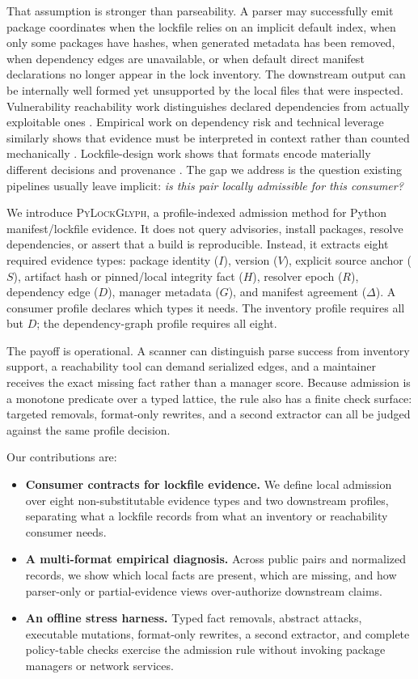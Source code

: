 \documentclass[10pt,conference]{IEEEtran}
\newcommand{\tool}{\textsc{PyLockGlyph}}
\begin{document}
That assumption is stronger than parseability. A parser may successfully emit package coordinates when the lockfile relies on an implicit default index, when only some packages have hashes, when generated metadata has been removed, when dependency edges are unavailable, or when default direct manifest declarations no longer appear in the lock inventory. The downstream output can be internally well formed yet unsupported by the local files that were inspected. Vulnerability reachability work distinguishes declared dependencies from actually exploitable ones \cite{ponta2020vuln,pashchenko2022vuln4real}. Empirical work on dependency risk and technical leverage similarly shows that evidence must be interpreted in context rather than counted mechanically \cite{pashchenko2018matter,massacci2021leverage}. Lockfile-design work shows that formats encode materially different decisions and provenance \cite{gamage2025lockfiles}. The gap we address is the question existing pipelines usually leave implicit: \emph{is this pair locally admissible for this consumer?}

We introduce \tool, a profile-indexed admission method for Python manifest/lockfile evidence. It does not query advisories, install packages, resolve dependencies, or assert that a build is reproducible. Instead, it extracts eight required evidence types: package identity ($I$), version ($V$), explicit source anchor ($S$), artifact hash or pinned/local integrity fact ($H$), resolver epoch ($R$), dependency edge ($D$), manager metadata ($G$), and manifest agreement ($\Delta$). A consumer profile declares which types it needs. The inventory profile requires all but $D$; the dependency-graph profile requires all eight.

The payoff is operational. A scanner can distinguish parse success from inventory support, a reachability tool can demand serialized edges, and a maintainer receives the exact missing fact rather than a manager score. Because admission is a monotone predicate over a typed lattice, the rule also has a finite check surface: targeted removals, format-only rewrites, and a second extractor can all be judged against the same profile decision.

Our contributions are:
\begin{itemize}
\item \textbf{Consumer contracts for lockfile evidence.} We define local admission over eight non-substitutable evidence types and two downstream profiles, separating what a lockfile records from what an inventory or reachability consumer needs.
\item \textbf{A multi-format empirical diagnosis.} Across \SubjectCount{} public pairs and \PackageCount{} normalized records, we show which local facts are present, which are missing, and how parser-only or partial-evidence views over-authorize downstream claims.
\item \textbf{An offline stress harness.} Typed fact removals, abstract attacks, executable mutations, format-only rewrites, a second extractor, and complete policy-table checks exercise the admission rule without invoking package managers or network services.
\end{itemize}
\end{document}
